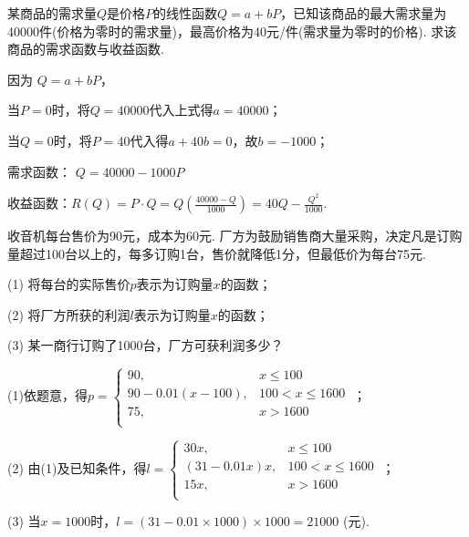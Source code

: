 \begin{problem}某商品的需求量$Q$是价格$P$的线性函数$Q = a + bP$，已知该商品的最大需求量为40000件(价格为零时的需求量)，最高价格为40元/件(需求量为零时的价格).
	求该商品的需求函数与收益函数.
	
	\begin{solution} 
		因为
		$Q = a + bP，$
		
		当$P = 0$时，将$Q = 40000$代入上式得$a = 40000$；
		
		当$Q = 0$时，将$P = 40$代入得$a + 40b = 0$，故$b = - 1000$；
		
		需求函数： $Q = 40000 - 1000P$
		
		收益函数：$R\left( Q \right) = P \cdot Q = Q\left( \displaystyle \frac{40000 - Q}{1000} \right) = 40Q - \displaystyle \frac{Q^{2}}{1000}.$
		
	\end{solution}   
\end{problem}

\begin{problem}收音机每台售价为90元，成本为60元.
	厂方为鼓励销售商大量采购，决定凡是订购量超过100台以上的，每多订购1台，售价就降低1分，但最低价为每台75元.
	
	(1) 将每台的实际售价$p$表示为订购量$x$的函数；
	
	(2) 将厂方所获的利润$l$表示为订购量$x$的函数；
	
	(3) 某一商行订购了1000台，厂方可获利润多少？
	
	\begin{solution} (1)依题意，得$p = \left\{ \begin{matrix}
		90,& x \leq 100 \\
		90 - 0.01\left( x - 100 \right),& 100 < x \leq 1600 \\
		75,& x > 1600 \\
		\end{matrix} \right.\ $；
		
		(2) 由(1)及已知条件，得$l = \left\{ \begin{matrix}
		30x,& x \leq 100 \\
		\left( 31 - 0.01x \right)x, & 100 < x \leq 1600 \\
		15x,& x > 1600 \\
		\end{matrix} \right.\ $；
		
		(3)
		当$x = 1000$时，$l = \left( 31 - 0.01 \times 1000 \right) \times 1000 = 21000$
		(元).
		
	\end{solution}   
\end{problem}



